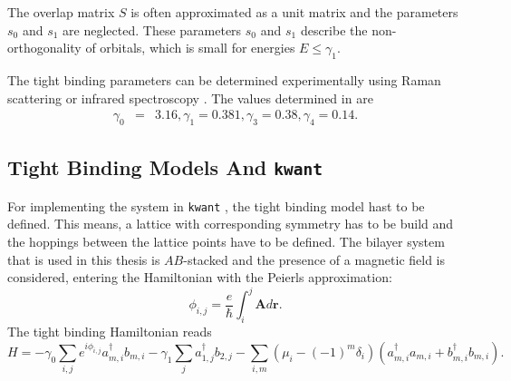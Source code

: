 The overlap matrix $S$ is often approximated as a unit matrix and the parameters $s_0$ and $s_1$ are neglected. These parameters $s_0$ and $s_1$ describe the non-orthogonality of orbitals, which is small for energies $E \leq \gamma_1$.

The tight binding parameters can be determined experimentally using Raman scattering \cite{Malard2007} or infrared spectroscopy \cite{Kuzmenko2009}. The values determined in \cite{Kuzmenko2009} are
\begin{eqnarray}
\gamma_0 &=& 3.16,
\gamma_1 = 0.381, 
\gamma_3 = 0.38,
\gamma_4 = 0.14.
\end{eqnarray}

\subsection{Tight Binding Models And \texttt{kwant}}
For implementing the system in \texttt{kwant} , the tight binding model hast to be defined. This means,  a lattice with corresponding symmetry has to be build and the hoppings between the lattice points have to be defined. The bilayer system that is used in this thesis is $AB$-stacked and the presence of a magnetic field is considered, entering the Hamiltonian with the Peierls approximation:
\begin{equation}
\phi_{i, j} = \frac{e}{\hbar} \int_i^j \mathbf{A} d\mathbf{r}.
\end{equation}
The tight binding Hamiltonian reads
\begin{equation}
H = - \gamma_0 \sum_{i, j} e^{i \phi_{i, j }} a^\dagger_{m, i} b_{m, i} - \gamma_1 \sum_j a_{1, j}^\dagger b_{2, j} - \sum_{i, m} \left( \mu_i - (-1)^m \delta_i\right) \left(a^\dagger_{m, i} a_{m, i} + b^\dagger_{m, i} b_{m, i} \right).
\end{equation}
